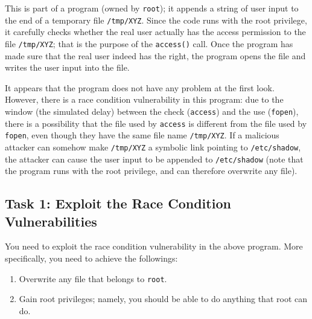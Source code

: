 This is part of a \setuid program (owned by {\tt root}); 
it appends a string of user input to
the end of a temporary file {\tt /tmp/XYZ}. Since the code runs
with the root privilege, it carefully 
checks whether the real user actually has the access permission to the file
{\tt /tmp/XYZ}; that is the purpose of the {\tt access()} call.
Once the program has made sure that the real user indeed has 
the right, the program opens the file and writes the user
input into the file. 

It appears that the program does not have any problem at the first look. 
However, there is a race condition vulnerability in this program: due to the 
window (the simulated delay) between the check ({\tt access}) and 
the use ({\tt fopen}), there is a possibility that the file used by
{\tt access} is different from the file used by {\tt fopen}, even
though they have the same file name {\tt /tmp/XYZ}.  If a malicious 
attacker can somehow make {\tt /tmp/XYZ} a symbolic link pointing to
{\tt /etc/shadow}, the attacker can cause the user input
to be appended to {\tt /etc/shadow} (note that the program runs with
the root privilege, and can therefore overwrite any file).


\subsection{Task 1: Exploit the Race Condition Vulnerabilities}

You need to exploit the race condition vulnerability in the above 
\setuid program. More specifically, you need to achieve the followings:

\begin{enumerate}
\item Overwrite any file that belongs to {\tt root}.

\item Gain root privileges; namely, you should be able to do anything 
      that root can do.  
\end{enumerate}



